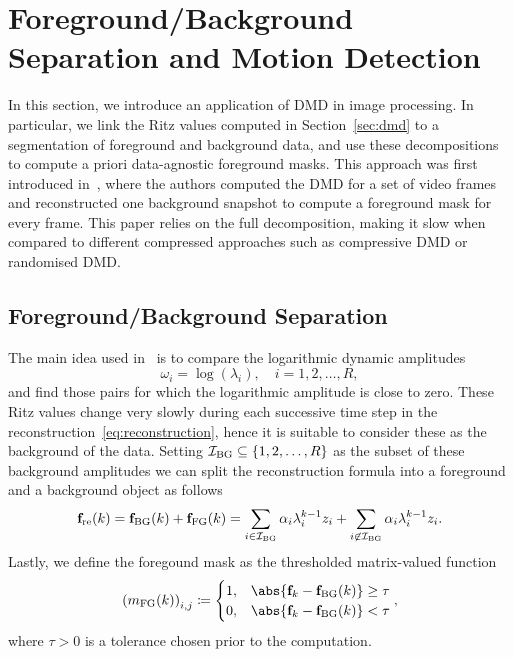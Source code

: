 \section{Foreground/Background Separation and Motion Detection}\label{sec:motion-detection}

In this section, we introduce an application of DMD in image processing. In particular, we link the Ritz values computed in Section~\ref{sec:dmd} to a segmentation of foreground and background data, and use these decompositions to compute a priori data-agnostic foreground masks. This approach was first introduced in~\cite{Grosek2014}, where the authors computed the DMD for a set of video frames and reconstructed one background snapshot to compute a foreground mask for every frame. This paper relies on the full decomposition, making it slow when compared to different compressed approaches such as compressive DMD or randomised DMD.

\subsection{Foreground/Background Separation}\label{subsec:fg-bg-separation} %

The main idea used in~\cite{Grosek2014, Kutz2015, Erichson2016} is to compare the logarithmic dynamic amplitudes
\begin{equation*}
    \omega_i = \log{(\lambda_i)},\quad i = 1, 2, \dots, R,
\end{equation*}
and find those pairs for which the logarithmic amplitude is close to zero. These Ritz values change very slowly during each successive time step in the reconstruction~\ref{eq:reconstruction}, hence it is suitable to consider these as the background of the data. Setting $\mathcal{I}_\text{BG} \subseteq \left\{1, 2, \dots, R\right\}$ as the subset of these background amplitudes we can split the reconstruction formula into a foreground and a background object as follows
\begin{equation*}
    \mathbf{f}_\text{re}(k) = \mathbf{f}_\text{BG}(k) + \mathbf{f}_\text{FG}(k) = \sum\limits_{i \in \mathcal{I}_\text{BG}} \alpha_i \lambda_i^{k - 1} z_i + \sum\limits_{i \not\in \mathcal{I}_\text{BG}} \alpha_i \lambda_i^{k - 1} z_i.
\end{equation*}
Lastly, we define the foregound mask as the thresholded matrix-valued function
\begin{equation*}
    \left(m_\text{FG}(k)\right)_{i, j} \coloneqq \begin{cases}
        1, & \abs{\bl{f}_k - \bl{f}_\text{BG}(k)} \geq \tau \\
        0, & \abs{\bl{f}_k - \bl{f}_\text{BG}(k)} < \tau
    \end{cases},
\end{equation*}
where $\tau > 0$ is a tolerance chosen prior to the computation.

